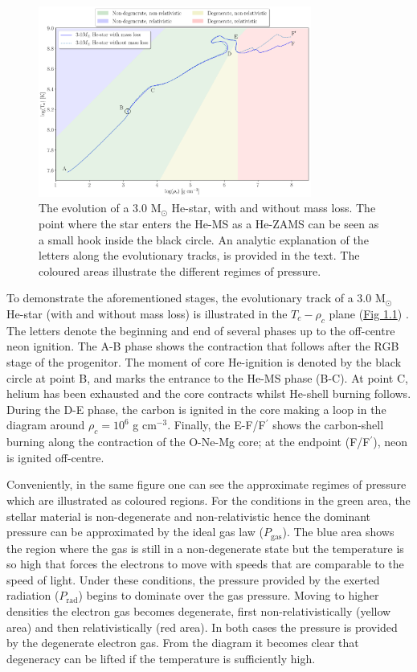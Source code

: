 \documentclass[../../main/thesis_msc.tex]{subfiles}
\begin{document}
				\begin{figure}[t]
					\centering
					\includegraphics[width=0.8\textwidth]{../figures/chapter1/T_rho_plane_ch1_shaded.png}
					\caption{The evolution of a $3.0$ M$_{\odot}$ He-star, with and without mass loss. The point where the star enters the He-MS as a He-ZAMS can be seen as a small hook inside the black circle. An analytic explanation of the letters along the evolutionary tracks, is provided in the text. The coloured areas illustrate the different regimes of pressure.}
					\label{fig:T_rho_plane_ch1}
				\end{figure}
				
				To demonstrate the aforementioned stages, the evolutionary track of a $3.0$ M$_{\odot}$ He-star (with and without mass loss) is illustrated in the $T_c - \rho_c$ plane (\hyperref[fig:T_rho_plane_ch1]{Fig 1.1}) \citep[see also][]{Habets_a, Habets_b, Nomoto1987}. The letters denote the beginning and end of several phases up to the off-centre neon ignition. The A-B phase shows the contraction that follows after the RGB stage of the progenitor. The moment of core He-ignition is denoted by the black circle at point B, and marks the entrance to the He-MS phase (B-C). At point C, helium has been exhausted and the core contracts whilst He-shell burning follows. During the D-E phase, the carbon is ignited in the core making a loop in the diagram around $\rho_c = 10^6$ g cm$^{-3}$. Finally, the E-F/F$^\prime$ shows the carbon-shell burning along the contraction of the O-Ne-Mg core; at the endpoint (F/F$^\prime$), neon is ignited off-centre.
				
				Conveniently, in the same figure one can see the approximate regimes of pressure which are illustrated as coloured regions. For the conditions in the green area, the stellar material is non-degenerate and non-relativistic hence the dominant pressure can be approximated by the ideal gas law ($P_{\text{gas}}$). The blue area shows the region where the gas is still in a non-degenerate state but the temperature is so high that forces the electrons to move with speeds that are comparable to the speed of light. Under these conditions, the pressure provided by the exerted radiation ($P_{\text{rad}}$) begins to dominate over the gas pressure. Moving to higher densities the electron gas becomes degenerate, first non-relativistically (yellow area) and then relativistically (red area). In both cases the pressure is provided by the degenerate electron gas. From the diagram it becomes clear that degeneracy can be lifted if the temperature is sufficiently high.
				
\end{document}

